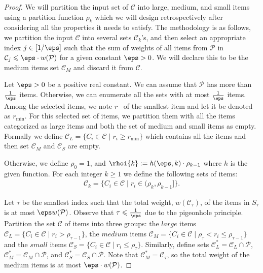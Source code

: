 \begin{proof}
We will partition the input set of $\mathcal{C}$ into large, medium, and small items using a partition function $\rho_k$ which we will design retrospectively after considering all the properties it needs to satisfy. The methodology is as follows, we partition the input $\mathcal{C}$ into several sets \(\mathcal{C}_k\)'s, and then select an appropriate index \(j \in [1/\eps]\) such that the sum of weights of all items from $\mathcal{P}$ in \( \mathcal{C}_j \leqslant \eps\cdot w(\mathcal{P})\) for a given constant $\eps>0$. We will declare this to be the medium items set $\mathcal{C}_M$ and discard it from $\mathcal{C}$.


Let $\eps>0$ be a positive real constant. We can assume that $\mathcal{P}$ has more than $\frac{1}{\eps}$ items. Otherwise, we can enumerate all the sets with at most \(\frac{1}{\eps}\) items. Among the selected items, we note \(r\) \ of the smallest item and let it be denoted as \(r_{\text{min}}\). For this selected set of items, we partition them with all the items categorized as large items and both the set of medium and small items as empty. Formally we define \(\mathcal{C}_L = \{C_{i} \in \mathcal{C} \mid r_{i}\geq r_{\text{min}}\}\) which contains all the items and then set \(\mathcal{C}_M\) and \(\mathcal{C}_S\) are empty.

Otherwise, we define $\rho_0=1$, and $\rhoi{k} := h(\eps, k) \cdot \rho_{k-1}$ where $h$ is the given function. For each integer $k \geqslant 1$ we define the following sets of items:
\begin{align*}
\mathcal{C}_k = \{C_i \in \mathcal{C} \mid r_{i} \in (\rho_{k},\rho_{k-1}]\}.
\end{align*}

Let $\tau$ be the smallest index such that the total weight, $w(\mathcal{C}_{\tau})$, of the items in $S_{\tau}$ is at most $\eps w(\mathcal{P})$. Observe that $\tau \leqslant \frac{1}{\eps}$ due to the pigeonhole principle. Partition the set $\mathcal{C}$ of items into three groups: the $\textit{large}$ items $\mathcal{C}_L = \{C_{i} \in \mathcal{C} \mid r_{i}>\rho_{\tau-1}\}$, the $\textit{medium}$ items $\mathcal{C}_M = \{C_{i} \in \mathcal{C} \mid \rho_{\tau} < r_{i} \leqslant \rho_{\tau-1}\}$ and the $\textit{small}$ items $\mathcal{C}_S = \{C_{i} \in \mathcal{C} \mid r_{i} \leqslant \rho_{\tau}\}$. Similarly, define sets $\mathcal{C}_L^* = \mathcal{C}_L \cap \mathcal{P}$, $\mathcal{C}_M^* = \mathcal{C}_M \cap \mathcal{P}$, and $\mathcal{C}_S^* = \mathcal{C}_S \cap \mathcal{P}$. Note that $\mathcal{C}_M^* = \mathcal{C}_{\tau}$, so the total weight of the medium items is at most $\eps\cdot w(\mathcal{P})$.
\end{proof}


